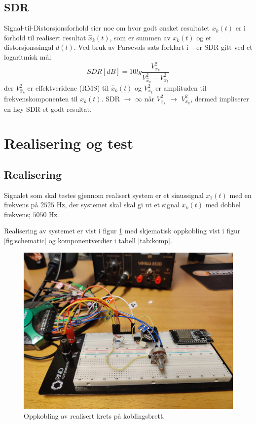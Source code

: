 \documentclass[a4paper,11pt,norsk]{article}
\begin{document}
\subsection{SDR}
\label{sub:sdr}
Signal-til-Distorsjonsforhold sier noe om hvor godt ønsket resultatet $x_k(t)$ er i forhold til realisert resultat $\hat{x}_k(t)$, som er summen av $x_k(t)$ og et distorsjonssingal $d(t)$. Ved bruk av Parsevals sats forklart i ~\cite[Eit kvalitetsmål, s. 3-4)]{notat} er SDR gitt ved et logaritmisk mål 
\begin{equation*}
    SDR[dB] = 10lg\frac{V^2_{x_{k}}}{V^2_{\hat{x}_{k}}-V^2_{x_{k}}} 
\end{equation*}
der $V^2_{\hat{x}_{k}}$ er effektveridene (RMS) til $\hat{x}_k(t)$ og $V^2_{x_{k}}$ er amplituden til frekvenskomponenten til $x_k(t)$. SDR $\xrightarrow{}$ $\infty$ når $V^2_{\hat{x}_{k}}$ $\xrightarrow{}$ $V^2_{x_{k}}$, dermed impliserer en høy SDR et godt resultat. 

\section{Realisering og test}
\label{sec:realisering}
\subsection{Realisering}
Signalet som skal testes gjennom realisert system er et sinussignal $x_1(t)$ med en frekvens på $2525$ Hz, der systemet skal skal gi ut et signal $x_k(t)$ med dobbel frekvens; $5050$ Hz.

Realisering av systemet er vist i figur \ref{fig:oppkobling} med skjematisk oppkobling vist i figur \ref{fig:schematic} og komponentverdier i tabell \ref{tab:komp}.

\begin{figure}[H]
  \centering
  \includegraphics[scale=0.1]{D1/Images/circuit.jpg}
  \caption{Oppkobling av realisert krets på koblingsbrett.}
  \label{fig:oppkobling}
\end{figure}
\end{document}
